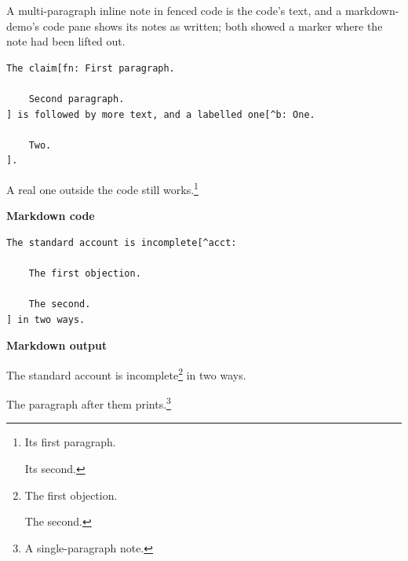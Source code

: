A multi-paragraph inline note in fenced code is the code's text, and a
markdown-demo's code pane shows its notes as written; both showed a marker
where the note had been lifted out.

\begin{verbatim}
The claim[fn: First paragraph.

    Second paragraph.
] is followed by more text, and a labelled one[^b: One.

    Two.
].
\end{verbatim}

A real one outside the code still works.\footnote{Its first paragraph.

    Its second.}

\par\medskip\noindent\textbf{Markdown code}\par\nopagebreak
\begin{verbatim}
The standard account is incomplete[^acct:

    The first objection.

    The second.
] in two ways.
\end{verbatim}

\noindent\textbf{Markdown output}\par\nopagebreak
The standard account is incomplete\footnote{The first objection.

    The second.} in two ways.
\par\medskip

The paragraph after them prints.\footnote{A single-paragraph note.}

